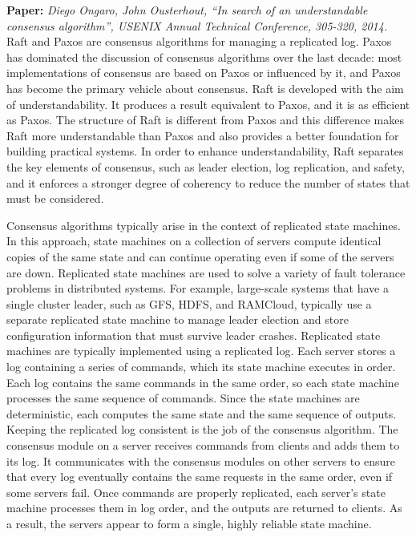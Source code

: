 \documentclass[12pt,letterpaper]{article}
\begin{document}
\textbf{Paper: }\textit{Diego Ongaro, John Ousterhout, “In search of an understandable consensus algorithm”, USENIX Annual Technical Conference, 305-320, 2014.} \\

Raft and Paxos are consensus algorithms for managing a replicated log. Paxos has dominated the discussion of consensus algorithms over the last decade: most implementations of consensus are based on Paxos or influenced by it, and Paxos has become the primary vehicle about consensus. Raft is developed with the aim of understandability. It produces a result equivalent to Paxos, and it is as efficient as Paxos. The structure of Raft is different from Paxos and this difference makes Raft more understandable than Paxos and also provides a better foundation for building practical systems. In order to enhance understandability, Raft separates the key elements of consensus, such as leader election, log replication, and safety, and it enforces a stronger degree of coherency to reduce the number of states that must be considered.

Consensus algorithms typically arise in the context of replicated state machines. In this approach, state machines on a collection of servers compute identical copies of the same state and can continue operating even if some of the servers are down. Replicated state machines are used to solve a variety of fault tolerance problems in distributed systems. For example, large-scale systems that have a single cluster leader, such as GFS, HDFS, and RAMCloud, typically use a separate replicated state machine to manage leader election and store configuration information that must survive leader crashes. Replicated state machines are typically implemented using a replicated log. Each server stores a log containing a series of commands, which its state machine executes in order. Each log contains the same commands in the same order, so each state machine processes the same sequence of commands. Since the state machines are deterministic, each computes the same state and the same sequence of outputs. Keeping the replicated log consistent is the job of the consensus algorithm. The consensus module on a server receives commands from clients and adds them to its log. It communicates with the consensus modules on other servers to ensure that every log eventually contains the same requests in the same order, even if some servers fail. Once commands are properly replicated, each server’s state machine processes them in log order, and the outputs are returned to clients. As a result, the servers appear to form a single, highly reliable state machine.
\end{document}

